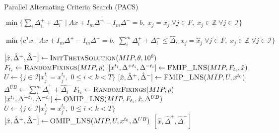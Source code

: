 \begin{algorithm}[htbp]
\caption{Parallel Alternating Criteria Search (PACS)}\label{alg:PACS}
\begin{algorithmic}
    \State \Return $\min\{\sum_i \Delta^+_i + \Delta^-_i \mid A x + I_m \Delta^+ - I_m \Delta^- = b, \; x_j = \hat{x}_j \; \forall j \in F, \; x_j \in \mathbb{Z} \; \forall j \in \mathcal{I}\}$
\EndFunction
\end{algorithmic}
\vspace{1em}
\begin{algorithmic}
    \State \Return $\min\{c^T x \mid A x + I_m \Delta^+ - I_m \Delta^- = b, \; \sum_i^m \Delta^+_i + \Delta^-_i \leq \hat{\Delta}, \; x_j = \hat{x}_j \; \forall j \in F, \; x_j \in \mathbb{Z} \; \forall j \in \mathcal{I}\}$
\EndFunction
\end{algorithmic}
\vspace{1em}
\begin{algorithmic}[1]
\Require{Original $MIP$ formulation; PACS Execution time limit $TL_{PACS}$; Number of threads $T$; Initial solution parameter $\theta \in (0,100]$; Variable fixing parameter $\rho \in (0,1)$}
\State $[\hat{x}, \hat{\Delta}^+, \hat{\Delta}^-] \gets \Call{InitThetaSolution}{MIP,\theta,10^6}$
            \State $F_{t_i} \gets \Call{RandomFixings}{MIP,\rho}$
            \State $[x^{t_i}, \Delta^{+t_i}, \Delta^{-t_i}] \gets \Call{FMIP\_LNS}{MIP,F_{t_i}, \hat{x}}$
        \EndFor
        \State $U \gets \{ j \in \mathcal{I} | x^{t_i}_j = x^{t_k}_j, \; 0 \leq i < k < T\}$
        \State $[\hat{x}, \hat{\Delta}^+, \hat{\Delta}^-] \gets \Call{FMIP\_LNS}{MIP,U, x^{t_0}}$
    \EndIf
    \State $\Delta^{UB} \gets \sum_i^m \hat{\Delta}_i^+ + \hat{\Delta}_i^-$
            \State $F_{t_i} \gets \Call{RandomFixings}{MIP,\rho}$
            \State $[x^{t_i}, \Delta^{+t_i}, \Delta^{-t_i}] \gets \Call{OMIP\_LNS}{MIP,F_{t_i}, \hat{x}, \Delta^{UB}}$
    \EndFor
    \State $U \gets \{ j \in \mathcal{I} | x^{t_i}_j = x^{t_k}_j, \; 0 \leq i < k < T\}$
    \State $[\hat{x}, \hat{\Delta}^+, \hat{\Delta}^-] \gets \Call{OMIP\_LNS}{MIP,U, x^{t_0}, \Delta^{UB}}$
\EndWhile
\State \Return $[\hat{x}, \hat{\Delta}^+, \hat{\Delta}^-]$
\EndFunction
\end{algorithmic}
\end{algorithm}
